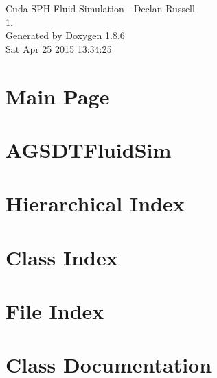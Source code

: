 \documentclass[twoside]{book}
\newcommand{\clearemptydoublepage}{%
  \newpage{\pagestyle{empty}\cleardoublepage}%
}
\begin{document}
\hypersetup{pageanchor=false}
\begin{titlepage}
\vspace*{7cm}
\begin{center}%
{\Large Cuda S\-P\-H Fluid Simulation -\/ Declan Russell \\[1ex]\large 1. }\\
\vspace*{1cm}
{\large Generated by Doxygen 1.8.6}\\
\vspace*{0.5cm}
{\small Sat Apr 25 2015 13:34:25}\\
\end{center}
\end{titlepage}
\clearemptydoublepage
\tableofcontents
\clearemptydoublepage
{}
\hypersetup{pageanchor=true}

\chapter{Main Page}
\label{index}\hypertarget{index}{}
\chapter{A\-G\-S\-D\-T\-Fluid\-Sim}
\label{md__r_e_a_d_m_e}
\hypertarget{md__r_e_a_d_m_e}{}

\chapter{Hierarchical Index}

\chapter{Class Index}

\chapter{File Index}

\chapter{Class Documentation}




















\end{document}
